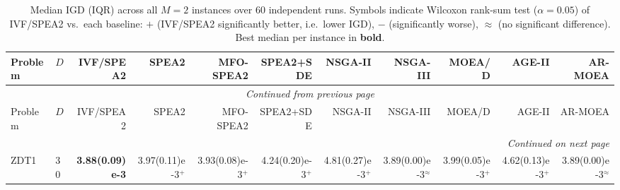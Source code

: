 \documentclass[pdflatex,sn-mathphys-ay]{sn-jnl}%
\theoremstyle{thmstyleone}%
\theoremstyle{thmstyletwo}%
\theoremstyle{thmstylethree}%
\begin{document}
\begin{landscape}
	{\tiny
		\setlength{\tabcolsep}{2pt}%
		\renewcommand{\arraystretch}{0.95}%
		\begin{longtable}{llrrrrrrrrr}
			\caption{Median IGD (IQR) across all $M=2$ instances over 60 independent runs. Symbols indicate Wilcoxon rank-sum test ($\alpha=0.05$) of IVF/SPEA2 vs.\ each baseline: $+$ (IVF/SPEA2 significantly better, i.e.\ lower IGD), $-$ (significantly worse), $\approx$ (no significant difference). Best median per instance in \textbf{bold}.}
			\label{tab:igd_per_instance_m2}                                                                                                                                                                                                                                                                                         \\
			\toprule
			Problem                           & $D$ & IVF/SPEA2              & SPEA2                              & MFO-SPEA2                    & SPEA2+SDE                 & NSGA-II                   & NSGA-III                     & MOEA/D                       & AGE-II                       & AR-MOEA                     \\
			\midrule
			\endfirsthead
			\multicolumn{11}{c}{{\textit{Continued from previous page}}}                                                                                                                                                                                                                                                            \\
			\toprule
			Problem                           & $D$ & IVF/SPEA2              & SPEA2                              & MFO-SPEA2                    & SPEA2+SDE                 & NSGA-II                   & NSGA-III                     & MOEA/D                       & AGE-II                       & AR-MOEA                     \\
			\midrule
			\endhead
			\midrule
			\multicolumn{11}{r}{{\textit{Continued on next page}}}                                                                                                                                                                                                                                                                  \\
			\endfoot
			\botrule
			\endlastfoot
			ZDT1                              & 30  & \textbf{3.88(0.09)e-3} & 3.97(0.11)e-3$^{+}$                & 3.93(0.08)e-3$^{+}$          & 4.24(0.20)e-3$^{+}$       & 4.81(0.27)e-3$^{+}$       & 3.89(0.00)e-3$^{\approx}$    & 3.99(0.05)e-3$^{+}$          & 4.62(0.13)e-3$^{+}$          & 3.89(0.00)e-3$^{\approx}$   \\

\end{longtable}}
\end{landscape}
\end{document}
